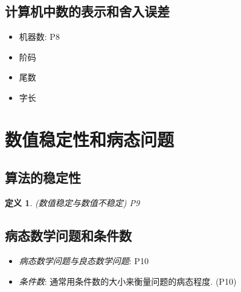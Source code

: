 \documentclass[twoside]{article}
\newtheorem{definition}{定义}[section]
\begin{document}
\subsection{计算机中数的表示和舍入误差}
\begin{itemize}
  \item 机器数: P8
  \item 阶码
  \item 尾数
  \item 字长
\end{itemize}

\section{数值稳定性和病态问题}
\subsection{算法的稳定性}
\begin{definition}
  (数值稳定与数值不稳定) P9
\end{definition}

\subsection{病态数学问题和条件数}
\begin{itemize}
  \item \textit{病态数学问题与良态数学问题}: P10
  \item \textit{条件数}: 通常用条件数的大小来衡量问题的病态程度. (P10)
\end{itemize}
\end{document}
